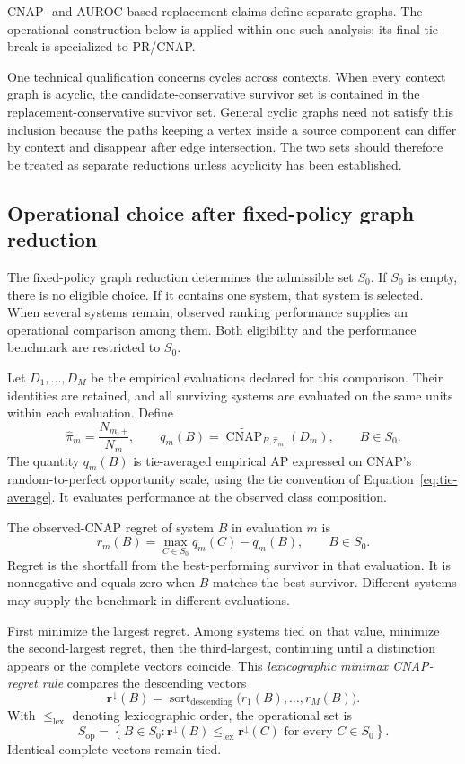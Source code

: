 \documentclass[11pt]{article}
\newcommand{\CNAP}{\operatorname{CNAP}}
\newcommand{\CNAPta}{\widetilde{\CNAP}}
\theoremstyle{remark}
\begin{document}
CNAP- and AUROC-based replacement claims define separate graphs. The
operational construction below is applied within one such analysis; its final
tie-break is specialized to PR/CNAP.

One technical qualification concerns cycles across contexts. When every
context graph is acyclic, the candidate-conservative survivor set is contained
in the replacement-conservative survivor set. General cyclic graphs need not
satisfy this inclusion because the paths keeping a vertex inside a source
component can differ by context and disappear after edge intersection. The two
sets should therefore be treated as separate reductions unless acyclicity has
been established.

\subsection{Operational choice after fixed-policy graph reduction}
\label{app:multi-system-operational}

The fixed-policy graph reduction determines the admissible set $S_0$.
If $S_0$ is empty, there is no eligible choice. If it contains one system,
that system is selected. When several systems remain, observed ranking
performance supplies an operational comparison among them. Both eligibility
and the performance benchmark are restricted to $S_0$.

Let $D_1,\ldots,D_M$ be the empirical evaluations declared for this comparison.
Their identities are retained, and all surviving systems are evaluated on the
same units within each evaluation. Define
\[
\widehat{\pi}_m=\frac{N_{m,+}}{N_m},
\qquad
q_m(B)=\CNAPta_{B,\widehat{\pi}_m}(D_m),
\qquad B\in S_0.
\]
The quantity $q_m(B)$ is tie-averaged empirical AP expressed on CNAP's
random-to-perfect opportunity scale, using the tie convention of
Equation~\eqref{eq:tie-average}. It evaluates performance at the observed
class composition.

The observed-CNAP regret of system $B$ in evaluation $m$ is
\begin{equation}
r_m(B)
=
\max_{C\in S_0}q_m(C)-q_m(B),
\qquad B\in S_0.
\label{eq:observed-cnap-regret}
\end{equation}
Regret is the shortfall from the best-performing survivor in that evaluation.
It is nonnegative and equals zero when $B$ matches the best survivor.
Different systems may supply the benchmark in different evaluations.

First minimize the largest regret. Among systems tied on that value, minimize
the second-largest regret, then the third-largest, continuing until a
distinction appears or the complete vectors coincide. This
\emph{lexicographic minimax CNAP-regret rule} compares the descending vectors
\[
\mathbf r^\downarrow(B)
=
\operatorname{sort}_{\mathrm{descending}}
\bigl(r_1(B),\ldots,r_M(B)\bigr).
\]
With $\leq_{\mathrm{lex}}$ denoting lexicographic order, the operational set is
\begin{equation}
S_{\mathrm{op}}
=
\left\{
B\in S_0:
\mathbf r^\downarrow(B)\leq_{\mathrm{lex}}\mathbf r^\downarrow(C)
\text{ for every }C\in S_0
\right\}.
\label{eq:operational-cnap-selection}
\end{equation}
Identical complete vectors remain tied.
\end{document}
